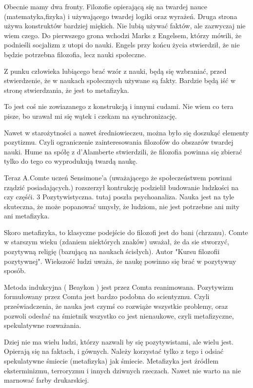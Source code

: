 \documentclass[11pt]{article}
\begin{document}
Obecnie mamy dwa fronty. Filozofie opierającą się na twardej nauce (matematyka,fizyka) i używającego twardej logiki oraz wyrażeń. Druga strona używa konstruktów bardziej miękich. Nie lubią używać faktów, ale zazwyczaj nie wiem czego. Do pierwszego grona wchodzi Marks z Engelsem, którzy mówili, że podnieśli socjalizm z utopi do nauki. Engels przy końcu życia stwierdził, że nie będzie potrzebna filozofia, lecz nauki społeczne. 

Z punku człowieka lubiącego brać wzór z nauki, będą się wzbraniać, przed stwierdzenie, że w naukach społecznych używane są fakty. Bardzie będą iść w stronę stwierdzania, że jest to metafizyka. 

To jest coś nie zowiazanego z konstrukcją i innymi cudami. Nie wiem co tera pisze, bo urawał mi się wątek i czekam na synchronizację. 

Nawet w starożytności a nawet średniowieczeu, można było się doszukąć elementy pozytizmu. Czyli ograniczenie zainteresowania filozofów do obszarów twardej nauki. Hume na spółę z d'Alamberte stwierdzili, że filozofia powinna się zbierać tylko do tego co wyprodukują twardą naukę.

Teraz A.Comte uczeń Sensimone'a (uważającego że społeczeństwem powinni rządzić posiadających.) rozszerzył kontrukcję podzielił budowanie ludzkości na czy częśći. 3 Pozytywistyczna. tutaj poszła psychoanaliza. Nauka jest na tyle skuteczna, że może  popanować umysły, że ludziom, nie jest potrzebne ani mity ani metafizyka. 

Skoro metafizyka, to klasyczne podejście do filozofi jest do bani (chrzanu). Comte w starszym wieku (zdaniem niektórych znaków) uważał, że da sie stworzyć, pozytywną religię (bazującą na naukach ścisłych). Autor "Kursu filozofii pozytywnej". Wiekszość ludzi uważa, że naukę powinno się brać w pozytywny sposób. 

Metoda indukcyjna ( Beaykon ) jest przez Comta reanimowana. Pozytywizm formułowany przez Comta jest bardzo podobna do scientyzmu. Czyli przeświadczenia, że nauka jest czymś co rozwiąże wszystkie problemy, oraz pozwoli odesłać na śmietnik wszystko co jest nienaukowe, czyli metafizyczne, spekulatywne rozważania. 

Dziej nie ma wielu ludzi, którzy nazwali by się pozytywistami, ale wielu jest. Opierają się na faktach, i gównych. Należy korzystać tylko z tego i odsiać spekulatywne śmiecie (metafizyka) jak śmiecie. Metafizyka jest źródłem eksterminizmu, terroryzmu i innych dziwnych rzeczach. Nawet nie warto na nie marnować farby drukarskiej.
\end{document}
